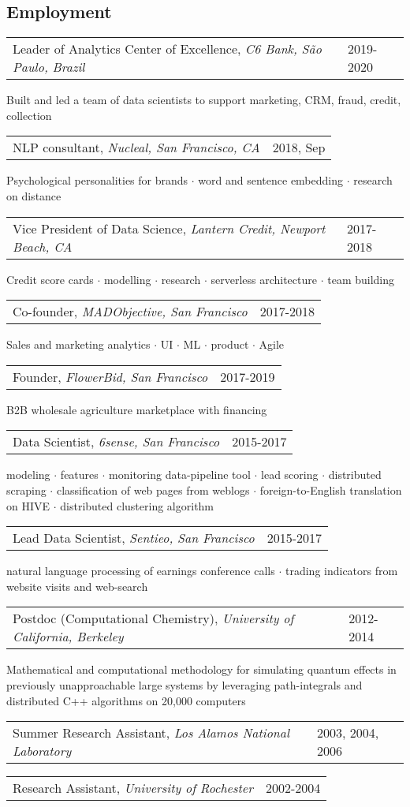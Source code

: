 \documentclass{res}
\makeatletter
\newcommand{\af}[3]{
\begin{tabular*}{\textwidth}[t]{@{}p{5.2in} l} 
    #1, \textit{#2} & #3\\
  \end{tabular*}
}
\newcommand{\aff}[4]{
\begin{tabular*}{\textwidth}[t]{@{}p{5.2in} l} 
    #1, \textit{#2} & #3\\
  \end{tabular*}
  {\color[RGB]{106,106,106} #4}\\
}
\makeatother
\begin{document}
 


\address{
  1632 Walnut St.\\
  Berkeley, CA 94709 \\
}
\address{
  (585) 313-6024\\
  kirill.igum@gmail.com\\
  \url{www.linkedin.com/in/kirilligum}
}

\begin{resume}

\section{Employment}
\aff{
Leader of Analytics Center of Excellence}{C6 Bank, S\~{a}o Paulo, Brazil}{2019-2020}{ 
	Built and led a team of data scientists to support marketing, CRM, fraud, credit, collection
}
\aff{NLP consultant}{Nucleal, San Francisco, CA}{2018, Sep}{ 
	Psychological personalities for brands $\cdot$ word and sentence embedding $\cdot$ research on distance
}
\aff{Vice President of Data Science}{Lantern Credit, Newport Beach, CA}{2017-2018}{ 
	Credit score cards $\cdot$ modelling $\cdot$ research $\cdot$ serverless architecture $\cdot$ team building
} 
\aff{Co-founder}{MADObjective, San Francisco}{2017-2018}{ 
	Sales and marketing analytics $\cdot$ UI $\cdot$ ML $\cdot$ product $\cdot$ Agile
} 
\aff{Founder}{FlowerBid, San Francisco}{2017-2019}{ 
	B2B wholesale agriculture marketplace with financing 
} 
\aff{Data Scientist}{6sense, San Francisco}{2015-2017}{ 
	modeling $\cdot$ 
	features $\cdot$  
	monitoring data-pipeline tool $\cdot$ 
	lead scoring $\cdot$
	distributed scraping $\cdot$
	classification of web pages from weblogs $\cdot$
	foreign-to-English translation on HIVE $\cdot$
	distributed clustering algorithm
} 
\aff{Lead Data Scientist}{Sentieo, San Francisco}{2015-2017}{ 
	natural language processing of earnings conference calls $\cdot$ trading indicators from website visits and web-search
} 
\aff{Postdoc (Computational Chemistry)}{University of California, Berkeley}{2012-2014}{ 
  Mathematical and computational methodology for simulating quantum effects in previously unapproachable large systems by leveraging path-integrals and distributed C++ algorithms on 20,000 computers
} 
\af{Summer Research Assistant}{Los Alamos National Laboratory}{2003, 2004, 2006}
\af{Research Assistant}{University of Rochester}{2002-2004}
 

\end{resume}
\end{document}
